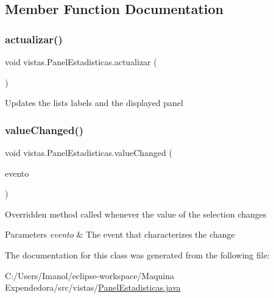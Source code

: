 \subsection{Member Function Documentation}
\mbox{\label{classvistas_1_1_panel_estadisticas_a3daac089d3c88691869b45d9c0961b30}} 
\subsubsection{\texorpdfstring{actualizar()}{actualizar()}}
{\footnotesize\ttfamily void vistas.\+Panel\+Estadisticas.\+actualizar (\begin{DoxyParamCaption}{ }\end{DoxyParamCaption})}

Updates the list\textquotesingle{}s labels and the displayed panel \mbox{\label{classvistas_1_1_panel_estadisticas_ad053d06b278eae5f7f54af0476ca0461}} 
\subsubsection{\texorpdfstring{value\+Changed()}{valueChanged()}}
{\footnotesize\ttfamily void vistas.\+Panel\+Estadisticas.\+value\+Changed (\begin{DoxyParamCaption}\item[{List\+Selection\+Event}]{evento }\end{DoxyParamCaption})}

Overridden method called whenever the value of the selection changes 
\begin{DoxyParams}{Parameters}
{\em evento} & The event that characterizes the change \\
\hline
\end{DoxyParams}


The documentation for this class was generated from the following file\+:\begin{DoxyCompactItemize}
\item 
C\+:/\+Users/\+Imanol/eclipse-\/workspace/\+Maquina Expendedora/src/vistas/\mbox{\hyperlink{_panel_estadisticas_8java}{Panel\+Estadisticas.\+java}}\end{DoxyCompactItemize}
